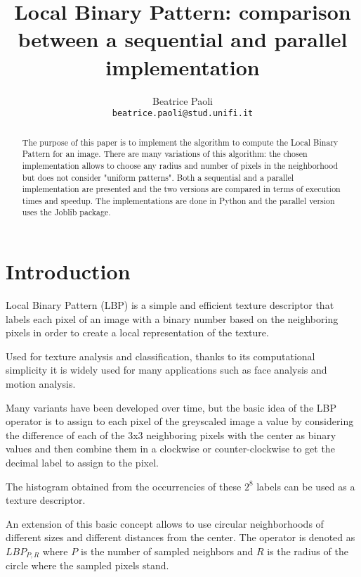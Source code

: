 \documentclass[10pt,twocolumn,letterpaper]{article}
\begin{document}
\title{Local Binary Pattern: comparison between a sequential and parallel implementation}

\author{Beatrice Paoli\\
{\tt\small beatrice.paoli@stud.unifi.it}
}

\maketitle
\thispagestyle{empty}

\begin{abstract}
The purpose of this paper is to implement the algorithm to compute the Local Binary Pattern for an image. There are many variations of this algorithm: the chosen implementation allows to choose any radius and number of pixels in the neighborhood but does not consider "uniform patterns". Both a sequential and a parallel implementation are presented and the two versions are compared in terms of execution times and speedup. The implementations are done in Python and the parallel version uses the Joblib package.
\end{abstract}


\section{Introduction}
Local Binary Pattern (LBP) is a simple and efficient texture descriptor that labels each pixel of an image with a binary number based on the neighboring pixels in order to create a local representation of the texture.

Used for texture analysis and classification, thanks to its computational simplicity it is widely used for many applications such as face analysis and motion analysis.

Many variants have been developed over time, but the basic idea of the LBP operator is to assign to each pixel of the greyscaled image a value by 
considering the difference of each of the 3x3 neighboring pixels with the center as binary values and then combine them in a clockwise or counter-clockwise to get the decimal label to assign to the pixel.

The histogram obtained from the occurrencies of these $2^8$ labels can be used as a texture descriptor.

An extension of this basic concept allows to use circular neighborhoods of different sizes and different distances from the center. The operator is denoted as $LBP_{P, R}$ where $P$ is the number of sampled neighbors and $R$ is the radius of the circle where the sampled pixels stand.
\end{document}
